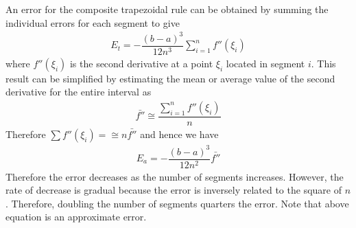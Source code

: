 \documentclass[book.tex]{subfiles}
\begin{document}
An error for the composite trapezoidal rule can be obtained by summing the individual errors for each segment to give
\begin{align}
E_t = -\dfrac{(b-a)^3}{12n^3}\sum_{i=1}^{n}f''(\xi_i)
\end{align}
where $f''(\xi_i)$ is the second derivative at a point $\xi_i$ located in segment $i$. This result can be simplified by estimating the mean or average value of the second derivative for the entire interval as
\begin{align}
\bar{f''} \cong \dfrac{\sum_{i=1}^{n}f''(\xi_i)}{n}
\end{align}
Therefore $\sum f''(\xi_i) = \cong n\bar{f''}$ and hence we have
\begin{align}
E_a = -\dfrac{(b-a)^3}{12n^2}\bar{f''}
\end{align}
Therefore the error decreases as the number of segments increases. However, the rate of decrease is gradual because the error is inversely related to the square of $n$. Therefore, doubling the number of segments quarters the error. Note that above equation is an approximate error.
\end{document}
